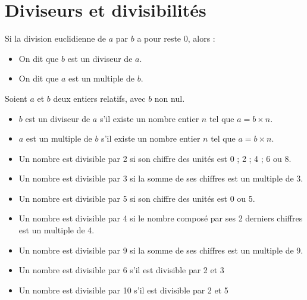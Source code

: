 \section{Diviseurs et divisibilités}

{Si la division euclidienne de $a$ par $b$ a pour reste 0, alors :
\begin{itemize}
    \item On dit que $b$ est un diviseur de $a$.
    \item On dit que $a$ est un multiple de $b$.
\end{itemize}
}

{Soient $a$ et $b$  deux entiers relatifs, avec $b$ non nul.
\begin{itemize}
    \item $b$ est un diviseur de $a$ s'il existe un nombre entier $n$ tel que $a=b\times n$.
    \item $a$ est un multiple de $b$ s'il existe un nombre entier $n$ tel que $a=b\times n$.
\end{itemize}
}


{
    \begin{itemize}
        \item Un nombre est divisible par 2 si son chiffre des unités est 0 ; 2 ; 4 ; 6 ou 8.
        \item Un nombre est divisible par 3 si la somme de ses chiffres est un multiple de 3.
        \item Un nombre est divisible par 5 si son chiffre des unités est 0 ou 5.
    \end{itemize}
}


{
    \begin{itemize}
        \item Un nombre est divisible par 4 si le nombre composé par ses 2 derniers chiffres est un multiple de 4.
        \item Un nombre est divisible par 9 si la somme de ses chiffres est un multiple de 9.
    \end{itemize}
}

{
    \begin{itemize}
        \item Un nombre est divisible par 6 s'il est divisible par 2 et 3
        \item Un nombre est divisible par 10 s'il est divisible par 2 et 5
    \end{itemize}
}